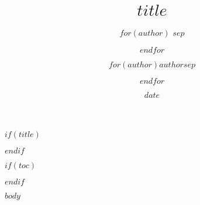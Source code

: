 \documentclass[10pt,conference]{../styles/IEEEtran}
\title{$title$}
\author{
    $for(author)$
        \authorblockN{$author.name$}
        \authorblockA{%
            $author.affiliation$ \\
            $author.location$ \\
            $author.email$}
        $sep$ \and
    $endfor$
}
\author{$for(author)$$author$$sep$ \and $endfor$}
\date{$date$}
\begin{document}
$if(title)$
\maketitle
$endif$

$if(toc)$
\tableofcontents

$endif$

$body$



\end{document}
